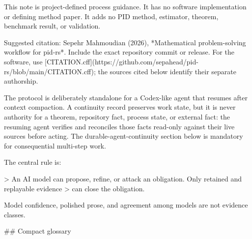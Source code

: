 \documentclass[11pt]{article}
\begin{document}
\begin{markdown}
This note is project-defined process guidance. It has no software implementation or defining
method paper. It adds no PID method, estimator, theorem, benchmark result, or validation.

Suggested citation: Sepehr Mahmoudian (2026), *Mathematical problem-solving workflow for pid-rs*.
Include the exact repository commit or release. For the software, use
[CITATION.cff](https://github.com/sepahead/pid-rs/blob/main/CITATION.cff); the sources cited below
identify their separate authorship.

The protocol is deliberately standalone for a Codex-like agent that resumes after context
compaction. A continuity record preserves work state, but it is never authority for a theorem,
repository fact, process state, or external fact: the resuming agent verifies and reconciles those
facts read-only against their live sources before acting. The durable-agent-continuity section
below is mandatory for consequential multi-step work.

The central rule is:

> An AI model can propose, refine, or attack an obligation. Only retained and replayable evidence
> can close the obligation.

Model confidence, polished prose, and agreement among models are not evidence classes.

## Compact glossary


\end{markdown}
\end{document}
